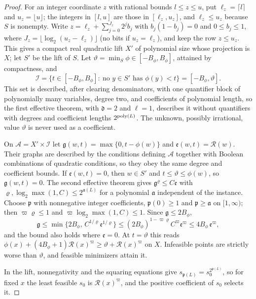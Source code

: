 \begin{proof}
For an integer coordinate $z$ with rational bounds $l\le z\le u$, put
$\ell_z=\lceil l\rceil$ and $u_z=\lfloor u\rfloor$; the integers in $[l,u]$
are those in $[\ell_z,u_z]$, and $\ell_z\le u_z$ because $S$ is nonempty.
Write $z=\ell_z+\sum_{j=0}^{J_z}2^jb_j$ with $b_j(1-b_j)=0$ and
$0\le b_j\le1$, where $J_z=\lfloor\log_2(u_z-\ell_z)\rfloor$ (no bits if
$u_z=\ell_z$), and keep the row $z\le u_z$. This gives a compact real
quadratic lift $X'$ of polynomial size whose projection is $X$; let $S'$ be
the lift of $S$. Let
$\vartheta=\min_S\phi\in[-B_\phi,B_\phi]$, attained by compactness, and
\[
\mathcal I=\{t\in[-B_\phi,B_\phi]:\ \text{no }y\in S'\text{ has }\phi(y)<t\}
=[-B_\phi,\vartheta].
\]
This set is described, after clearing denominators, with one quantifier
block of polynomially many variables, degree two, and coefficients of
polynomial length, so the first effective theorem, with $\mathfrak d=2$ and
$\ell=1$, describes it without quantifiers with degrees and coefficient
lengths $2^{\operatorname{poly}(L)}$. The unknown, possibly irrational, value $\vartheta$ is
never used as a coefficient.

On $\mathcal A=X'\times\mathcal I$ let $\mathfrak g(w,t)=\max\{0,t-\phi(w)\}$
and $\mathfrak e(w,t)=\mathcal R(w)$. Their graphs are described by the
conditions defining $\mathcal A$ together with Boolean combinations of
quadratic conditions, so they obey the same degree and coefficient bounds.
If $\mathfrak e(w,t)=0$, then $w\in S'$ and $t\le\vartheta\le\phi(w)$, so
$\mathfrak g(w,t)=0$. The second effective theorem gives
$\mathfrak g^\varrho\le C\mathfrak e$ with $\varrho,\log_2\max(1,C)\le
2^{\mathfrak a(L)}$ for a polynomial $\mathfrak a$ independent of the
instance. Choose $\mathfrak p$ with nonnegative integer coefficients,
$\mathfrak p(0)\ge1$ and $\mathfrak p\ge\mathfrak a$ on $[1,\infty)$; then
$\varpi\varrho\le1$ and $\varpi\log_2\max(1,C)\le1$. Since
$\mathfrak g\le2B_\phi$,
\[
\mathfrak g\le\min\{2B_\phi,\,C^{1/\varrho}\mathfrak e^{1/\varrho}\}
\le(2B_\phi)^{1-\varpi\varrho}C^{\varpi}\mathfrak e^{\varpi}
\le4B_\phi\,\mathfrak e^{\varpi},
\]
and the bound also holds where $\mathfrak e=0$. At $t=\vartheta$ this reads
$\phi(x)+(4B_\phi+1)\mathcal R(x)^{\varpi}\ge\vartheta+\mathcal
R(x)^{\varpi}$ on $X$. Infeasible points are strictly worse than $\vartheta$,
and feasible minimizers attain it.

In the lift, nonnegativity and the squaring equations give
$s_{\mathfrak p(L)}=s_0^{2^{\mathfrak p(L)}}$, so for fixed $x$ the least
feasible $s_0$ is $\mathcal R(x)^{\varpi}$, and the positive coefficient of
$s_0$ selects it.
\end{proof}

